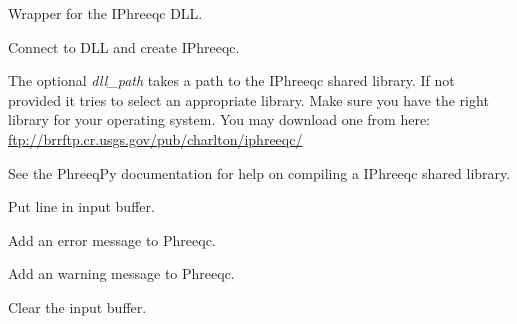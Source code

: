 \documentclass[letterpaper,10pt,english]{sphinxmanual}
\begin{document}
\begin{fulllineitems}
\label{iphreeqc:phreeqpy.iphreeqc.phreeqc_dll.IPhreeqc}
Wrapper for the IPhreeqc DLL.

Connect to DLL and create IPhreeqc.

The optional \emph{dll\_path} takes a path to the IPhreeqc shared library.
If not provided it tries to select an appropriate library.
Make sure you have the right library for your operating system.
You may download one from here:
\href{ftp://brrftp.cr.usgs.gov/pub/charlton/iphreeqc/}{ftp://brrftp.cr.usgs.gov/pub/charlton/iphreeqc/}

See the PhreeqPy documentation for help on compiling a IPhreeqc shared
library.

\begin{fulllineitems}
\label{iphreeqc:phreeqpy.iphreeqc.phreeqc_dll.IPhreeqc.accumulate_line}
Put line in input buffer.

\end{fulllineitems}


\begin{fulllineitems}
\label{iphreeqc:phreeqpy.iphreeqc.phreeqc_dll.IPhreeqc.add_error}
Add an error message to Phreeqc.

\end{fulllineitems}


\begin{fulllineitems}
\label{iphreeqc:phreeqpy.iphreeqc.phreeqc_dll.IPhreeqc.add_warning}
Add an warning message to Phreeqc.

\end{fulllineitems}


\begin{fulllineitems}
\label{iphreeqc:phreeqpy.iphreeqc.phreeqc_dll.IPhreeqc.clear_accumlated_lines}
Clear the input buffer.


\end{fulllineitems}
\end{fulllineitems}
\end{document}
